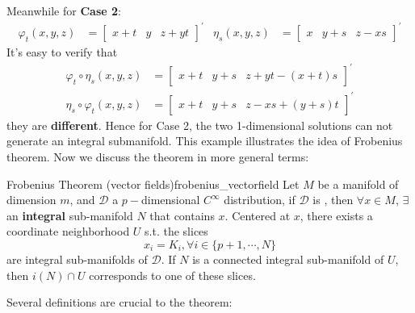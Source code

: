 Meanwhile for \textbf{Case 2}:
\begin{align*}
    \varphi_t(x,y,z) &= \begin{bmatrix}x+t & y & z+yt\end{bmatrix}^{\prime} & \eta_s(x,y,z)&= \begin{bmatrix}x & y+s & z-xs\end{bmatrix}^{\prime}
\end{align*}
It's easy to verify that 
\begin{align*}
    \varphi_t\circ \eta_s(x,y,z) &= \begin{bmatrix}x+t & y+s & z+yt-(x+t)s\end{bmatrix}^{\prime}\\
    \eta_s \circ\varphi_t(x,y,z) &= \begin{bmatrix}x+t & y+s & z-xs+(y+s)t\end{bmatrix}^{\prime}
\end{align*}
they are \textbf{different}. Hence for Case 2, the two 1-dimensional solutions can not generate an integral submanifold. This example illustrates the idea of Frobenius theorem. Now we discuss the theorem in more general terms:
\begin{theorem}{Frobenius Theorem (vector fields)}{frobenius_vectorfield}
    Let $M$ be a manifold of dimension $m$, and $\mathcal{D}$ a $p-$dimensional $C^{\infty}$ distribution, if $\mathcal{D}$ is , then $\forall x\in M$, $\exists$ an \textbf{integral} sub-manifold $N$ that contains $x$. Centered at $x$, there exists a coordinate neighborhood $U$ s.t. the slices
    $$
    x_i=K_i,\forall i\in\{ p+1,\cdots,N\}
    $$
    are integral sub-manifolds of $\mathcal{D}$. If $N$ is a connected integral sub-manifold of $U$, then $i(N)\cap U$ corresponds to one of these slices.
\end{theorem}
Several definitions are crucial to the theorem:
